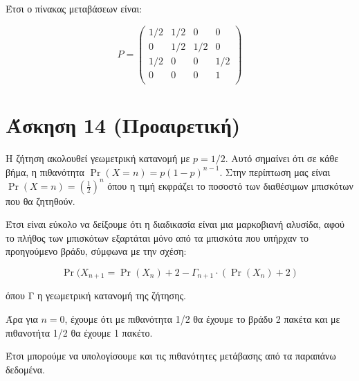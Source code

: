 \documentclass{article}
\begin{document}
Έτσι ο πίνακας μεταβάσεων είναι:

\begin{equation*}
    P = 
    \begin{pmatrix}
        1/2 & 1/2 & 0 & 0\\
        0 & 1/2 & 1/2 & 0\\
        1/2 & 0 & 0 & 1/2\\
        0 & 0 & 0 & 1\\
    \end{pmatrix}
\end{equation*}

\section*{Άσκηση 14 (Προαιρετική)}

Η ζήτηση ακολουθεί γεωμετρική κατανομή με $p=1/2$. Αυτό σημαίνει ότι σε κάθε βήμα, η πιθανότητα $\Pr(X=n) = p(1-p)^{n-1}$. Στην περίπτωση μας είναι $\Pr(X=n) = (\frac{1}{2})^n$ όπου η τιμή εκφράζει το ποσοστό των διαθέσιμων μπισκότων που θα ζητηθούν. 

Έτσι είναι εύκολο να δείξουμε ότι η διαδικασία είναι μια μαρκοβιανή αλυσίδα, αφού το πλήθος των μπισκότων εξαρτάται μόνο από τα μπισκότα που υπήρχαν το προηγούμενο βράδυ, σύμφωνα με την σχέση:

\begin{equation*}
    \Pr(X_{n+1} = \Pr(X_n) + 2 - Γ_{n+1} \cdot (\Pr(X_n) + 2)
\end{equation*}

όπου Γ η γεωμετρική κατανομή της ζήτησης.

Άρα για $n=0$, έχουμε ότι με πιθανότητα 1/2 θα έχουμε το βράδυ 2 πακέτα και με πιθανοτήτα 1/2 θα έχουμε 1 πακέτο. 

Έτσι μπορούμε να υπολογίσουμε και τις πιθανότητες μετάβασης από τα παραπάνω δεδομένα. 
\end{document}
